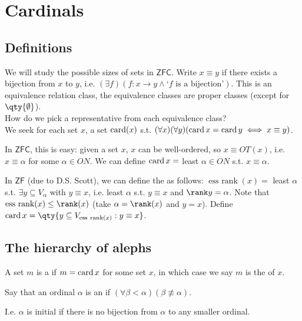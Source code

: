 \section{Cardinals}

\subsection{Definitions}
We will study the possible sizes of sets in $\mathsf{ZFC}$.
Write $x \equiv y$ if there exists a bijection from $x$ to $y$, i.e. $(\exists f)(f : x \to y \wedge \text{`$f$ is a bijection'})$.
This is an equivalence relation class, the equivalence classes are proper classes (except for $\qty{\emptyset}$). \\
How do we pick a representative from each equivalence class? \\
We seek for each set $x$, a set $\operatorname{card}(x)$ s.t. $(\forall x)(\forall y)(\operatorname{card} x = \operatorname{card} y \iff x \equiv y)$.

In $\mathsf{ZFC}$, this is easy: given a set $x$, $x$ can be well-ordered, so $x \equiv OT(x)$, i.e. $x \equiv \alpha$ for some $\alpha \in ON$.
We can define $\operatorname{card} x = $ least $\alpha \in ON$ s.t. $x \equiv \alpha$.

In $\mathsf{ZF}$ (due to D.S. Scott), we can define the  as follows:
$\operatorname{ess\ rank}(x) = $ least $\alpha$ s.t. $\exists y \subseteq V_\alpha$ with $y \equiv x$, i.e. least $\alpha$ s.t. $y \equiv x$ and $\rank y = \alpha$.
Note that $\operatorname{ess\ rank}(x) \leq \rank(x)$ (take $\alpha = \rank(x)$ and $y = x$).
Define $\card x = \qty{y  \subseteq V_{\operatorname{ess\ rank}(x)} : y \equiv x}$.

\subsection{The hierarchy of alephs}

\begin{definition}[Cardinal]
    A set $m$ is a  if $m = \operatorname{card} x$ for some set $x$, in which case we say $m$ is the  of $x$.
\end{definition}

\begin{definition}
    Say that an ordinal $\alpha$ is an  if $(\forall \beta < \alpha)(\beta \not\equiv \alpha)$.
\end{definition}
I.e. $\alpha$ is initial if there is no bijection from $\alpha$ to any smaller ordinal.

